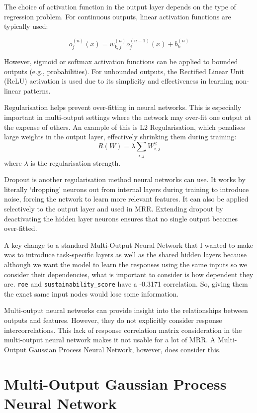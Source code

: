 The choice of activation function in the output layer depends on the type of regression problem. For continuous outputs, linear activation functions are typically used:

\[
o_j^{(n)}(x) = w_{k,j}^{(n)} o_j^{(n-1)}(x) + b_k^{(n)}
\]

However, sigmoid or softmax activation functions can be applied to bounded outputs (e.g., probabilities). For unbounded outputs, the Rectified Linear Unit (ReLU) activation is used due to its simplicity and effectiveness in learning non-linear patterns.

Regularisation helps prevent over-fitting in neural networks. This is especially important in multi-output settings where the network may over-fit one output at the expense of others. An example of this is L2 Regularisation, which penalises large weights in the output layer, effectively shrinking them during training:
    \[
    R(W) = \lambda \sum_{i,j} W_{i,j}^2
    \]
    where \( \lambda \) is the regularisation strength.\cite{menet2023mimonets}

Dropout is another regularisation method neural networks can use. It works by literally ‘dropping’ neurons out from internal layers during training to introduce noise, forcing the network to learn more relevant features. It can also be applied selectively to the output layer and used in MRR. Extending dropout by deactivating the hidden layer neurons ensures that no single output becomes over-fitted.

A key change to a standard Multi-Output Neural Network that I wanted to make was to introduce task-specific layers as well as the shared hidden layers because although we want the model to learn the responses using the same inputs so we consider their dependencies, what is important to consider is how dependent they are. \texttt{roe} and \texttt{sustainability\_score} have a -0.3171 correlation. So, giving them the exact same input nodes would lose some information.

Multi-output neural networks can provide insight into the relationships between outputs and features. However, they do not explicitly consider response intercorrelations. This lack of response correlation matrix consideration in the multi-output neural network makes it not usable for a lot of MRR. A Multi-Output Gaussian Process Neural Network, however, does consider this.

\section{Multi-Output Gaussian Process Neural Network}

